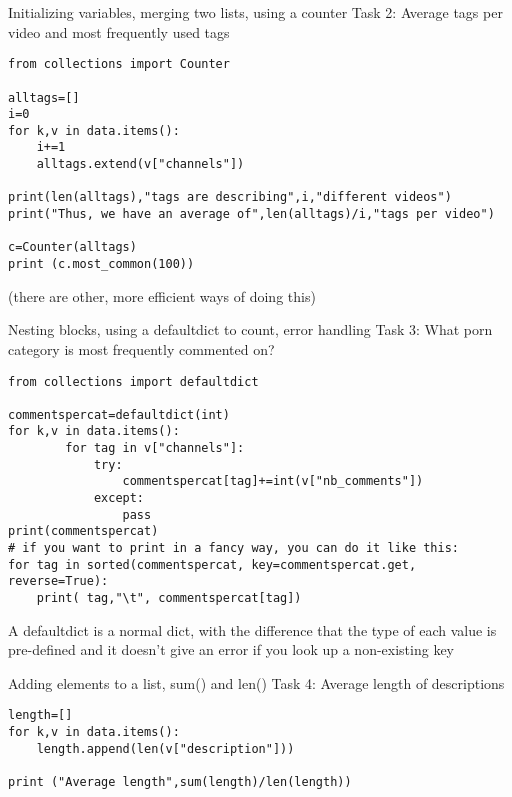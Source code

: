 \documentclass{beamer}
\begin{document}
\begin{frame}[fragile]{Initializing variables, merging two lists, using a counter}
Task 2: Average tags per video and most frequently used tags
\begin{lstlisting}
from collections import Counter
    
alltags=[]
i=0
for k,v in data.items():
    i+=1
    alltags.extend(v["channels"])

print(len(alltags),"tags are describing",i,"different videos")
print("Thus, we have an average of",len(alltags)/i,"tags per video")

c=Counter(alltags)
print (c.most_common(100))
\end{lstlisting}
\scriptsize{(there are other, more efficient ways of doing this)}

\end{frame}





\begin{frame}[fragile]{Nesting blocks, using a defaultdict to count, error handling}
Task 3: What porn category is most frequently commented on?
\begin{lstlisting}
from collections import defaultdict

commentspercat=defaultdict(int)
for k,v in data.items():
        for tag in v["channels"]:
            try:
                commentspercat[tag]+=int(v["nb_comments"])
            except:
                pass
print(commentspercat)
# if you want to print in a fancy way, you can do it like this:
for tag in sorted(commentspercat, key=commentspercat.get, reverse=True):
    print( tag,"\t", commentspercat[tag])
\end{lstlisting}
\scriptsize{A defaultdict is a normal dict, with the difference that the type of each value is pre-defined and it doesn't give an error if you look up a non-existing key}

\end{frame}



\begin{frame}[fragile]{Adding elements to a list, sum() and len()}
Task 4: Average length of descriptions
\begin{lstlisting}
length=[]
for k,v in data.items():
    length.append(len(v["description"]))
    
print ("Average length",sum(length)/len(length))
\end{lstlisting}

\end{frame}
\end{document}

